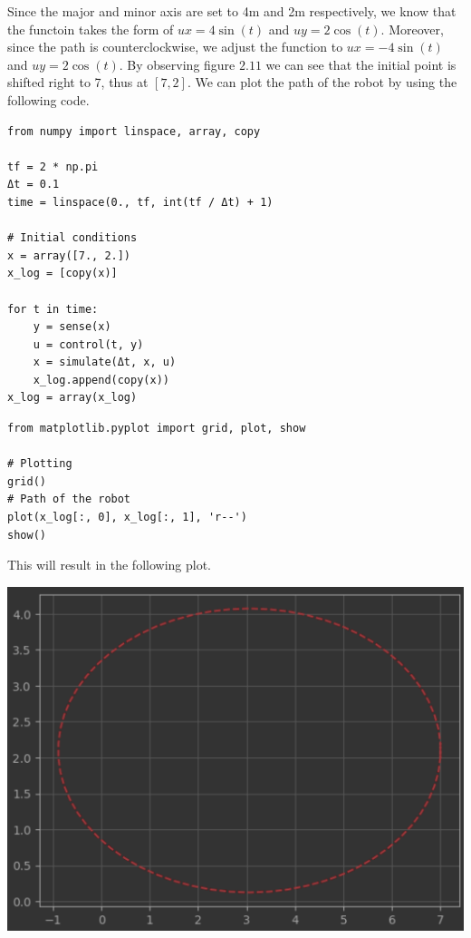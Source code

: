 \documentclass[letterpaper, 10 pt, conference]{ieeeconf}  %
\begin{document}
    Since the major and minor axis are set to 4m and 2m respectively, we know that the functoin takes the form of $ux = 4 \sin(t)$ and $uy = 2 \cos(t)$.
    Moreover, since the path is counterclockwise, we adjust the function to $ux = -4 \sin(t)$ and $uy = 2 \cos(t)$.
    By observing figure $2.11$ we can see that the initial point is shifted right to 7, thus at $[7, 2]$.
    We can plot the path of the robot by using the following code.
    \begin{lstlisting}[label={lst:lstlisting2}]
from numpy import linspace, array, copy

tf = 2 * np.pi
Δt = 0.1
time = linspace(0., tf, int(tf / Δt) + 1)

# Initial conditions
x = array([7., 2.])
x_log = [copy(x)]

for t in time:
    y = sense(x)
    u = control(t, y)
    x = simulate(Δt, x, u)
    x_log.append(copy(x))
x_log = array(x_log)
    \end{lstlisting}
    \begin{lstlisting}[label={lst:lstlisting3}]
from matplotlib.pyplot import grid, plot, show

# Plotting
grid()
# Path of the robot
plot(x_log[:, 0], x_log[:, 1], 'r--')
show()
    \end{lstlisting}
    This will result in the following plot.
    \begin{center}
        \includegraphics[scale=0.4]{exercise-1}
    \end{center}
\end{document}
